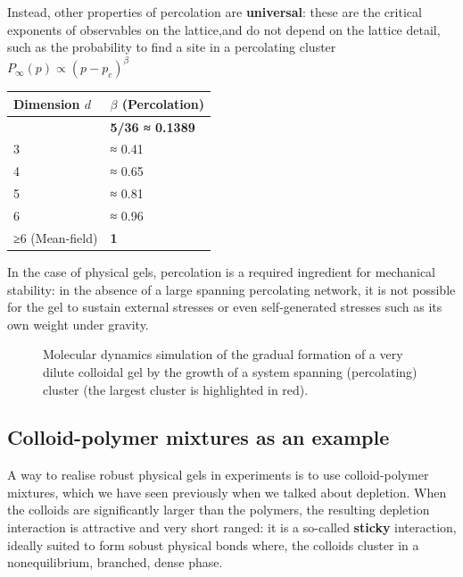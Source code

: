 \documentclass[
  letterpaper,
  enabledeprecatedfontcommands]{report}
\makeatletter
\newcommand*\pandocbounded[1]{%
  \sbox\pandoc@box{#1}%
  \Gscale@div\@tempa{\textheight}{\dimexpr\ht\pandoc@box+\dp\pandoc@box\relax}%
  \Gscale@div\@tempb{\linewidth}{\wd\pandoc@box}%
  \ifdim\@tempb\p@<\@tempa\p@\let\@tempa\@tempb\fi%
  \ifdim\@tempa\p@<\p@\scalebox{\@tempa}{\usebox\pandoc@box}%
  \else\usebox{\pandoc@box}%
  \fi%
}
\makeatother
\begin{document}
\begin{tcolorbox}
Instead, other properties of percolation are \textbf{universal}: these
are the critical exponents of observables on the lattice,and do not
depend on the lattice detail, such as the probability to find a site in
a percolating cluster \(P_{\infty}(p)\propto (p-p_c)^{\beta}\)

\begin{longtable}[]{@{}ll@{}}
\toprule\noalign{}
Dimension \(d\) & \(\beta\) (Percolation) \\
\midrule\noalign{}
\endhead
\bottomrule\noalign{}
\endlastfoot
2 & \textbf{5/36 ≈ 0.1389} \\
3 & ≈ 0.41 \\
4 & ≈ 0.65 \\
5 & ≈ 0.81 \\
6 & ≈ 0.96 \\
≥6 (Mean-field) & \textbf{1} \\
\end{longtable}

\end{tcolorbox}

In the case of physical gels, percolation is a required ingredient for
mechanical stability: in the absence of a large spanning percolating
network, it is not possible for the gel to sustain external stresses or
even self-generated stresses such as its own weight under gravity.

\begin{figure}[H]

{\centering \pandocbounded{\texttt{[image: soft-matter/./figs/m.gif]}}

}

\caption{Molecular dynamics simulation of the gradual formation of a
very dilute colloidal gel by the growth of a system spanning
(percolating) cluster (the largest cluster is highlighted in red).}

\end{figure}%

\subsection{Colloid-polymer mixtures as an
example}\label{colloid-polymer-mixtures-as-an-example}

A way to realise robust physical gels in experiments is to use
colloid-polymer mixtures, which we have seen previously when we talked
about depletion. When the colloids are significantly larger than the
polymers, the resulting depletion interaction is attractive and very
short ranged: it is a so-called \textbf{sticky} interaction, ideally
suited to form sobust physical bonds where, the colloids cluster in a
nonequilibrium, branched, dense phase.
\end{document}
